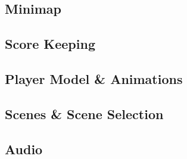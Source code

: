 \documentclass[11pt]{article}
\begin{document}
\subsection{Minimap}

\subsection{Score Keeping}

\subsection{Player Model \& Animations}

\subsection{Scenes \& Scene Selection}

\subsection{Audio}





\end{document}
